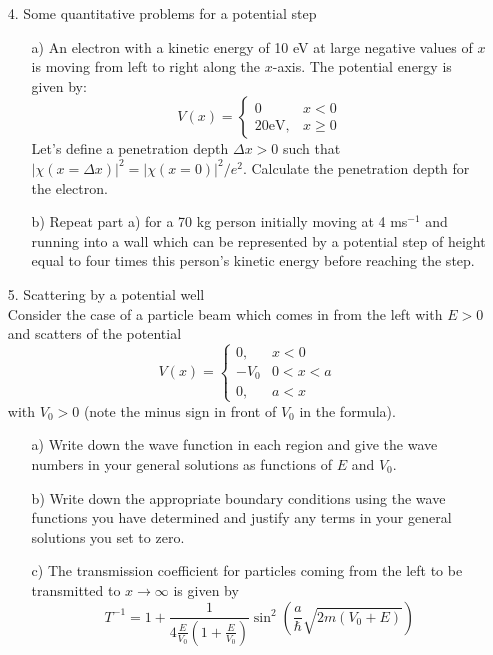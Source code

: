 \documentclass[11pt]{article}
\begin{document}
\begin{itemize}
%
\item[4.] Some quantitative problems for a potential step
\begin{itemize}
%
\item[a)]
An electron with a kinetic energy of 10 eV at large negative values of $x$ is moving from left to right
along the $x$-axis. The potential energy is given by:
\begin{displaymath}
V(x) =
\begin{cases}
0 &x<0\\
20 \mbox{eV}, &x \ge 0
\end{cases}
\end{displaymath}
Let's define a penetration depth $\Delta x > 0$ such that $|\chi(x=\Delta x)|^2 = |\chi(x=0)|^2/e^2$. Calculate the penetration depth for the electron.
\item[b)]
Repeat part a) for a 70 kg person initially moving at 4 ms$^{-1}$ and running into a wall which can be represented
by a potential step of height equal to four times this person's kinetic energy before reaching the step.
\end{itemize}
%
\vspace*{0.5cm}
%
\item[5.] Scattering by a potential well\\
Consider the case of a particle beam which comes in from the left with $E>0$ and scatters of the potential
\begin{displaymath}
V(x) =
\begin{cases}
0, &x < 0\\
-V_0&0 < x < a\\
0, &a < x
\end{cases}
\end{displaymath}
with $V_0>0$ (note the minus sign in front of $V_0$ in the formula).
\begin{itemize}
\item[a)]
Write down the wave function in each region and give the wave numbers in your general solutions as functions of $E$ and $V_0$.
\item[b)]
Write down the appropriate boundary conditions using the wave functions you have determined and justify any terms in your general solutions you set to zero.
\item[c)]
The transmission coefficient for particles coming from the left to be transmitted to $x \rightarrow \infty$ is given by
\begin{displaymath}
T^{-1} = 1 + \frac{1}{4\frac{E}{V_0}\left(1+\frac{E}{V_0}\right)}\sin^2\left(\frac{a}{\hbar}\sqrt{2m(V_0+E)}\right)

\end{displaymath}
\end{itemize}
\end{itemize}
\end{document}
